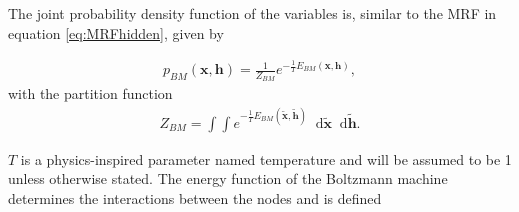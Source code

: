 \documentclass[twoside,english]{uiofysmaster}
\newcommand*\dif{\mathop{}\!\mathrm{d}}
\begin{document}

The joint probability density function of the variables is, similar to the MRF in equation \ref{eq:MRFhidden}, given by

\begin{align}
	p_{BM}(\bm{x}, \bm{h}) = \frac{1}{Z_{BM}} e^{-\frac{1}{T}E_{BM}(\bm{x}, \bm{h})} ,
\end{align}
with the partition function 
\begin{align}
	Z_{BM} = \int \int e^{-\frac{1}{T} E_{BM}(\tilde{\bm{x}}, \tilde{\bm{h}})} \dif \tilde{\bm{x}} \dif \tilde{\bm{h}} .
\end{align}

$T$ is a physics-inspired parameter named temperature and will be assumed to be 1 unless otherwise stated. The energy function of the Boltzmann machine determines the interactions between the nodes and is defined  
\end{document}
